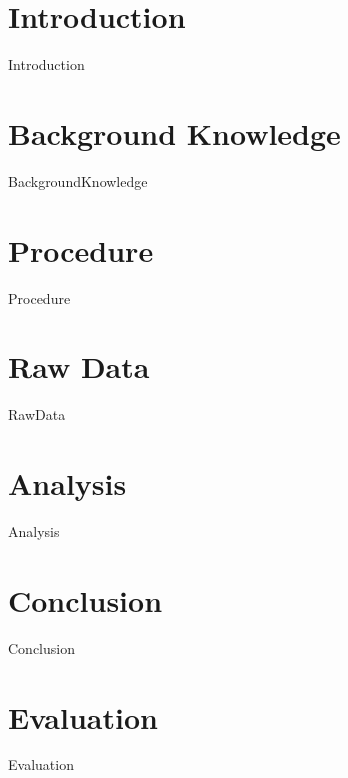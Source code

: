 \documentclass[12pt,a4paper]{article}
\begin{document}
\tableofcontents
\section{Introduction}
	{Introduction}
\section{Background Knowledge}
	{BackgroundKnowledge}
\section{Procedure}
	{Procedure}
\section{Raw Data}
	{RawData}
\section{Analysis}
		{Analysis}
\section{Conclusion}
	{Conclusion}
\section{Evaluation}
	{Evaluation}
	
	
\end{document}
